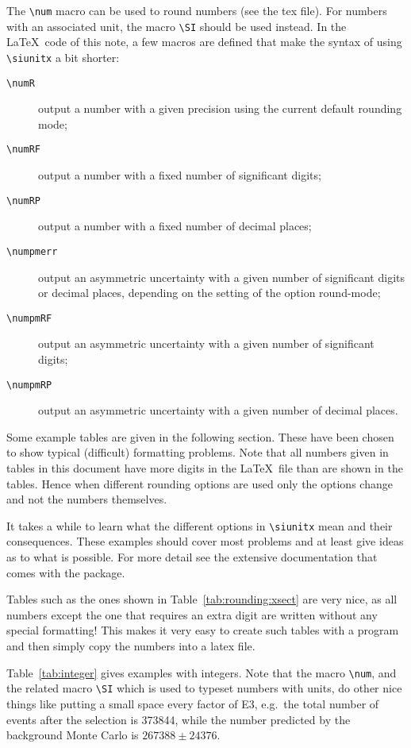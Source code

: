 \documentclass[UKenglish]{latex/atlasdoc}
\newcommand*{\numRF}[2]{\num[round-mode=figures,round-precision=#2]{#1}}
\newcommand*\Macro[1]{\texttt{\textbackslash#1}}
\begin{document}
The \Macro{num} macro can be used to round numbers (see the tex file). For numbers with
an associated unit, the macro \Macro{SI} should be used instead.
In the \LaTeX\ code of this note, a few macros are defined that make the
syntax of using \Macro{siunitx} a bit shorter:
\begin{description}
\item[\Macro{numR}] output a number with a given precision using the
  current default rounding mode;
\item[\Macro{numRF}] output a number with a fixed number of significant digits;
\item[\Macro{numRP}] output a number with a fixed number of decimal places;
\item[\Macro{numpmerr}] output an asymmetric uncertainty with a given number
  of significant digits or decimal places, depending on the setting of
  the option \textsf{round-mode};
\item[\Macro{numpmRF}] output an asymmetric uncertainty with a given number
  of significant digits;
\item[\Macro{numpmRP}] output an asymmetric uncertainty with a given number
  of decimal places.
\end{description}


Some example tables are given in the following section. These have
been chosen to show typical (difficult) formatting problems.  Note
that all numbers given in tables in this document have more digits in
the \LaTeX\ file than are shown in the tables. Hence when different
rounding options are used only the options change and not the numbers
themselves.

It takes a while to learn what the different options in
\Macro{siunitx} mean and their consequences. These
examples should cover most problems and at least give ideas as to what is
possible. For more detail see the extensive documentation that comes
with the package.

Tables such as the ones shown in
Table~\ref{tab:rounding:xsect} are very nice, as all numbers except the
one that requires an extra digit are written without any special
formatting! This makes it very easy to create such tables with a
program and then simply copy the numbers into a latex file.

Table~\ref{tab:integer} gives examples with integers. Note that the
macro \Macro{num}, and the related macro \Macro{SI} which is used to
typeset numbers with units, do other nice things like putting a
small space every factor of \num{E3}, e.g.\ the total number of events
after the selection is \num{373844}, while the number predicted by
the background Monte Carlo is
$\numRF{267388}{3} \pm \numRF{24376}{2}$.
\end{document}
